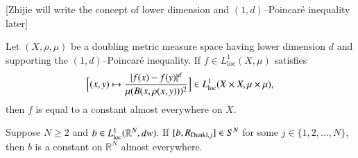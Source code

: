 \documentclass[12pt]{amsart}
\begin{document}
{\color{red}[Zhijie will write the concept of lower dimension and $(1,d)$--Poincar\'e inequality later]}
\begin{lemma}{\rm \cite[Corollary 4.3]{HKarxiv2}}\label{Hytonen-KorteLemma}
 Let $(X,\rho,\mu)$ be a doubling metric measure
space having lower dimension $d$ and supporting the $(1,d)$--Poincar\'e inequality. If $f\in L^1_{\mathrm{loc}}(X,\mu)$ satisfies
\begin{equation}
\Bigl[(x,y)\mapsto \frac{|f(x)-f(y)|^d}{\mu(B(x,\rho(x,y)))^2}\Bigr]\in L^1_{\mathrm{loc}}(X\times X,\mu\times\mu),
\end{equation}
then $f$ is equal to a constant almost everywhere on $X$.
\end{lemma}

\begin{proposition}\label{constantpro}
Suppose $N\geq 2$ and $b\in  L^1_{{\rm loc}}(\mathbb R^{N},dw)$. If $[b,R_{{\rm Dunkl},j}]\in S^N$ for some $j\in\{1,2,...,N\}$, then $b$ is a constant on $\mathbb{R}^N$ almost everywhere.
\end{proposition}
\end{document}
